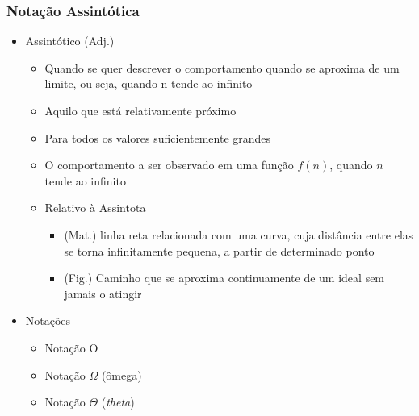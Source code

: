 \documentclass[aspectratio=169]{beamer}
\begin{document}
\begin{frame}\frametitle{Notação Assintótica}
\begin{itemize}
	\item Assintótico (Adj.)
	\begin{itemize}
		\item Quando se quer descrever o comportamento quando se aproxima de um limite, ou seja, quando n tende ao infinito
		\item Aquilo que está relativamente próximo
		\item Para todos os valores suficientemente grandes
		\item O comportamento a ser observado em uma função $f(n)$, quando $n$ tende ao infinito
		\item Relativo à Assintota
		\begin{itemize}
			\item (Mat.) linha reta relacionada com uma curva, cuja distância entre elas se torna infinitamente pequena, a partir de determinado ponto
			\item (Fig.) Caminho que se aproxima continuamente de um ideal sem jamais o atingir
		\end{itemize}
	\end{itemize}
	\item Notações
	\begin{itemize}
		\item Notação O
		\item Notação $\Omega$ (ômega)
		\item Notação $\Theta$ (\emph{theta})
	\end{itemize}
\end{itemize}
\end{frame}
\end{document}
